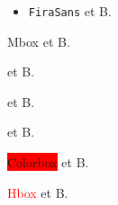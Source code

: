 \documentclass{article}
\begin{document}
\begin{itemize}
\item \Verb+FiraSans+ et B.
\end{itemize}
\mbox{Mbox} et B.

 et B.

 et B.

 et B.

\colorbox{red}{Colorbox} et B.


\textcolor{red}{\hbox{Hbox}} et B.
\end{document}
